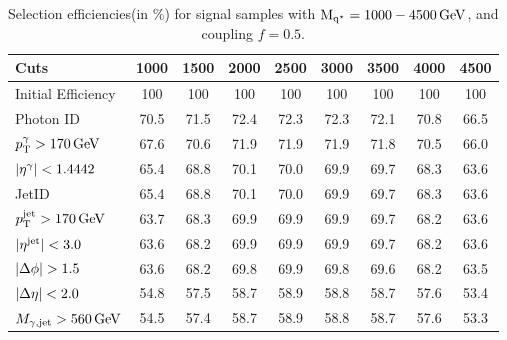 \begin{table}[h!]
 \begin{center}
  \begin{tabular}{|l||c|c|c|c|c|c|c|c|}
   \hline
 	Cuts                         & 1000 & 1500 & 2000 & 2500 & 3000 & 3500 & 4000 & 4500  \\
	\hline \hline
	Initial Efficiency           & 100 &  100 &  100 &  100 &  100 &  100 &  100 &  100 \\
	Photon ID                    & 70.5 &  71.5 &  72.4 &  72.3 &  72.3 &  72.1 &  70.8 &  66.5 \\
	$p_{\mathrm T}^{\mathrm{\gamma}}>170\mathrm{\,GeV}$ & 67.6 &  70.6 &  71.9 &  71.9 &  71.9 &  71.8 &  70.5 &  66.0 \\
	$\lvert \eta^{\mathrm{\gamma}} \rvert<1.4442$ & 65.4 &  68.8 &  70.1 &  70.0 &  69.9 &  69.7 &  68.3 &  63.6 \\
	JetID                        & 65.4 &  68.8 &  70.1 &  70.0 &  69.9 &  69.7 &  68.3 &  63.6 \\
	$p_{\mathrm T}^{\mathrm{\mathrm{jet}}}>170\mathrm{\,GeV}$   & 63.7 &  68.3 &  69.9 &  69.9 &  69.9 &  69.7 &  68.2 &  63.6 \\
	$\lvert \eta^{\mathrm{\mathrm{jet}}} \rvert<3.0$      & 63.6 &  68.2 &  69.9 &  69.9 &  69.9 &  69.7 &  68.2 &  63.6 \\
	$\lvert \Delta\phi \rvert>1.5$            & 63.6 &  68.2 &  69.8 &  69.9 &  69.8 &  69.6 &  68.2 &  63.5 \\
	$\lvert \Delta\eta \rvert<2.0$            & 54.8 &  57.5 &  58.7 &  58.9 &  58.8 &  58.7 &  57.6 &  53.4 \\
	$M_{\gamma, \mathrm{jet}}>560\mathrm{\,GeV}$     & 54.5 &  57.4 &  58.7 &  58.9 &  58.8 &  58.7 &  57.6 &  53.3 \\
   \hline
   \hline
  \end{tabular}
  \caption{Selection efficiencies(in \%) for \qstar signal samples with $\mathrm{M_{q^\star}}=1000-4500\mathrm{\,GeV}$, and coupling $f=0.5$.}
  \label{Table:HalfSigEff}
 \end{center}
\end{table}
